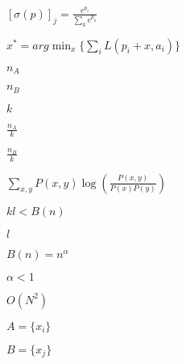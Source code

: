 \documentclass{article}
\begin{document}
$[\sigma(p)]_j = \frac{e^{p_i}}{\sum_k e^{p_k}}$
\pagebreak

$x^* = arg\min_x\{\sum_i{L(p_i + x, a_i)}\}$
\pagebreak

$n_A$
\pagebreak

$n_B$
\pagebreak

$k$
\pagebreak

$\frac{n_A}{k}$
\pagebreak

$\frac{n_B}{k}$
\pagebreak

$\sum_{x,y} P(x,y) \log\left(\frac{P(x,y)}{P(x)P(y)}\right)$
\pagebreak

$k l < B(n)$
\pagebreak

$l$
\pagebreak

$B(n) = n^{\alpha}$
\pagebreak

$\alpha < 1$
\pagebreak

$O(N^2)$
\pagebreak

$A = \{x_i\}$
\pagebreak

$B = \{x_j\}$
\pagebreak
\end{document}
